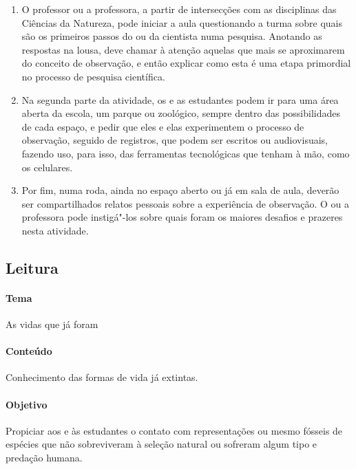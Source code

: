 \documentclass[11pt]{extarticle}
\begin{document}
\begin{enumerate}

	\item
	O professor ou a professora, a partir de intersecções com as disciplinas das 
	Ciências da Natureza, pode iniciar a aula questionando a turma sobre quais
	são os primeiros passos do ou da cientista numa pesquisa. Anotando as respostas
	na lousa, deve chamar à atenção aquelas que mais se aproximarem do conceito 
	de observação, e então explicar como esta é uma etapa primordial
	no processo de pesquisa científica.

	\item
	Na segunda parte da atividade, os e as estudantes podem ir 
	para uma área aberta da escola, um parque ou zoológico, sempre dentro
	das possibilidades de cada espaço, e pedir que eles e elas experimentem
	o processo de observação, seguido de registros, que podem ser
	escritos ou audiovisuais, fazendo uso, para isso, das ferramentas tecnológicas
	que tenham à mão, como os celulares.

	\item
	Por fim, numa roda, ainda no espaço aberto ou já em sala de aula,
	deverão ser compartilhados relatos pessoais sobre a experiência de observação.
	O ou a professora pode instigá"-los sobre quais foram os maiores desafios e 
	prazeres nesta atividade.
\end{enumerate}






\subsection{Leitura}

\paragraph{Tema} As vidas que já foram

\paragraph{Conteúdo} Conhecimento das formas de vida já extintas.

\paragraph{Objetivo} Propiciar aos e às estudantes o contato com representações
ou mesmo fósseis de espécies que não sobreviveram à seleção natural ou sofreram
algum tipo e predação humana. 
\end{document}
